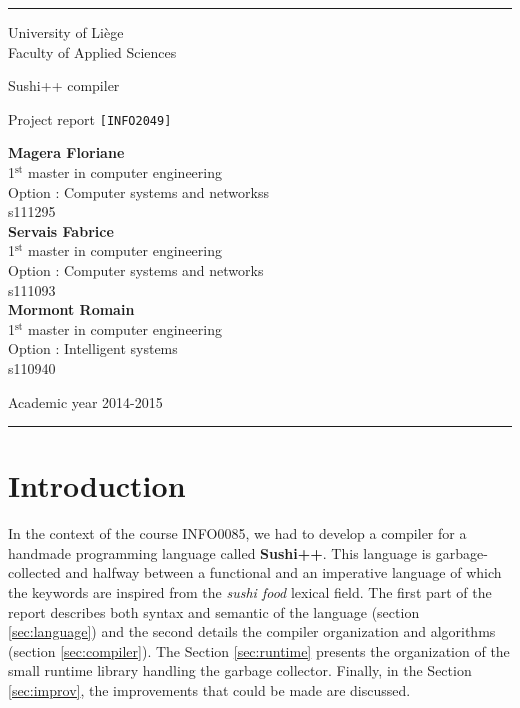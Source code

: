 \documentclass[a4paper,11pt]{article}
\begin{document}
\thispagestyle{empty}
\rule{1\linewidth}{1px}
{ \sc
\begin{center}
{\small University of Liège}\\
{\small Faculty of Applied Sciences}

\end{center}

\vfill
\begin{center}

{\Huge Sushi++ compiler\\}
\end{center}
\begin{center}
{\Huge Project report  {\LARGE \tt [INFO2049]} }
\end{center}
\begin{center}
\textbf{Magera Floriane}\\
{\small 1$^{\text{st}}$ master in computer engineering}\\
{\small Option : Computer systems and networkss}\\
{\small s111295} \\
\textbf{Servais Fabrice}\\
{\small 1$^{\text{st}}$ master in computer engineering}\\
{\small Option : Computer systems and networks}\\
{\small s111093} \\
\textbf{Mormont Romain}\\
{\small 1$^{\text{st}}$ master in computer engineering}\\
{\small Option : Intelligent systems}\\
{\small s110940} \\
\end{center}

\vfill
\begin{center}
Academic year 2014-2015\\
\end{center}
}
\rule{1\linewidth}{1px}
\newpage
\thispagestyle{empty}
\tableofcontents
\newpage
\setcounter{page}{1}
\section{Introduction}
In the context of the course INFO0085, we had to develop a compiler for a handmade programming language called \textbf{Sushi++}. This language is garbage-collected and halfway between a functional and an imperative language of which the keywords are inspired from the \textit{sushi food} lexical field. The first part of the report describes both syntax and semantic of the language (section \ref{sec:language}) and the second details the compiler organization and algorithms (section \ref{sec:compiler}). The Section \ref{sec:runtime} presents the organization of the small runtime library handling the garbage collector. Finally, in the Section \ref{sec:improv}, the improvements that could be made are discussed.
\end{document}
